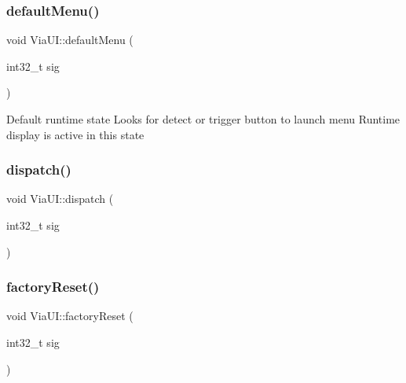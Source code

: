 \mbox{\label{class_via_u_i_af80f2151bdd13bc6e84517064100ed92}} 
\subsubsection{\texorpdfstring{default\+Menu()}{defaultMenu()}}
{\footnotesize\ttfamily void Via\+U\+I\+::default\+Menu (\begin{DoxyParamCaption}\item[{int32\+\_\+t}]{sig }\end{DoxyParamCaption})}

Default runtime state Looks for detect or trigger button to launch menu Runtime display is active in this state \mbox{\label{class_via_u_i_ae8bb5e76df4a1b3c1127829bd1be21f7}} 
\subsubsection{\texorpdfstring{dispatch()}{dispatch()}}
{\footnotesize\ttfamily void Via\+U\+I\+::dispatch (\begin{DoxyParamCaption}\item[{int32\+\_\+t}]{sig }\end{DoxyParamCaption})}

\mbox{\label{class_via_u_i_a04eb56786faec693ef8cbf4d41384ca1}} 
\subsubsection{\texorpdfstring{factory\+Reset()}{factoryReset()}}
{\footnotesize\ttfamily void Via\+U\+I\+::factory\+Reset (\begin{DoxyParamCaption}\item[{int32\+\_\+t}]{sig }\end{DoxyParamCaption})}

\mbox{\label{class_via_u_i_a301e1692cc55b1ee55ba0133b5308f87}} 
